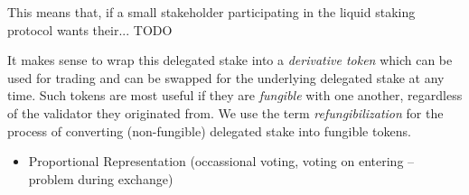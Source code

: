 This means that, if a small stakeholder
participating in the liquid staking protocol wants their... TODO

It makes sense to wrap this delegated
stake into a \emph{derivative token} which can be used for trading and can
be swapped for the underlying delegated stake at any time. Such tokens
are most useful if they are \emph{fungible} with one another, regardless
of the validator they originated from. We use the term
\emph{refungibilization} for the process of converting (non-fungible) delegated stake
into fungible tokens.

\begin{itemize}
    \item Proportional Representation
          (occassional voting, voting on entering -- problem during exchange)
\end{itemize}
